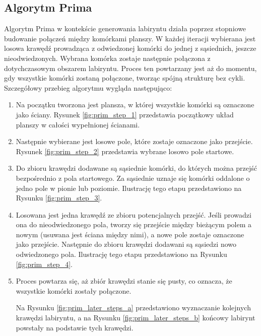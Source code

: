 \subsection{Algorytm Prima}

Algorytm Prima w kontekście generowania labiryntu działa poprzez stopniowe budowanie połączeń między komórkami planszy. W każdej iteracji wybierana jest losowa krawędź prowadząca z odwiedzonej komórki do jednej z sąsiednich, jeszcze nieodwiedzonych. Wybrana komórka zostaje następnie połączona z dotychczasowym obszarem labiryntu. Proces ten powtarzany jest aż do momentu, gdy wszystkie komórki zostaną połączone, tworząc spójną strukturę bez cykli. Szczegółowy przebieg algorytmu wygląda następująco:

\begin{enumerate}
    \item Na początku tworzona jest plansza, w której wszystkie komórki są oznaczone jako ściany. Rysunek \ref{fig:prim_step_1} przedstawia początkowy układ planszy w całości wypełnionej ścianami.
    
    

    \item Następnie wybierane jest losowe pole, które zostaje oznaczone jako przejście. Rysunek \ref{fig:prim_step_2} przedstawia wybrane losowo pole startowe.
    
    

    \item Do zbioru krawędzi dodawane są sąsiednie komórki, do których można przejść bezpośrednio z pola startowego. Za sąsiednie uznaje się komórki oddalone o jedno pole w pionie lub poziomie. Ilustrację tego etapu przedstawiono na Rysunku \ref{fig:prim_step_3}.
    
    

    \item Losowana jest jedna krawędź ze zbioru potencjalnych przejść. Jeśli prowadzi ona do nieodwiedzonego pola, tworzy się przejście między bieżącym polem a nowym (usuwana jest ściana między nimi), a nowe pole zostaje oznaczone jako przejście. Następnie do zbioru krawędzi dodawani są sąsiedzi nowo odwiedzonego pola. Ilustrację tego etapu przedstawiono na Rysunku \ref{fig:prim_step_4}.

    

    \item Proces powtarza się, aż zbiór krawędzi stanie się pusty, co oznacza, że wszystkie komórki zostały połączone.

    Na Rysunku \ref{fig:prim_later_steps_a} przedstawiono wyznaczanie kolejnych krawędzi labiryntu, a na Rysunku \ref{fig:prim_later_steps_b} końcowy labirynt powstały na podstawie tych krawędzi.
    
    
\end{enumerate}